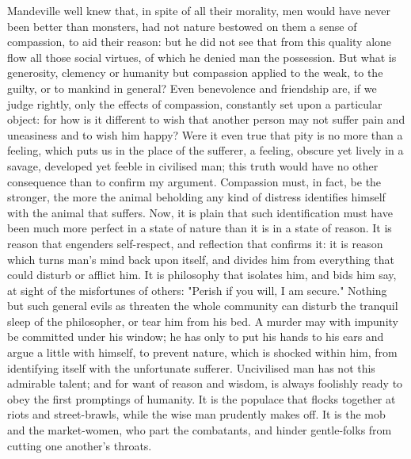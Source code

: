 \documentclass[12pt]{report}
\begin{document}
Mandeville well knew that, in spite of all their morality, men would have never been better than monsters, had not nature bestowed on them a sense of compassion, to aid their reason: but he did not see that from this quality alone flow all those social virtues, of which he denied man the possession. But what is generosity, clemency or humanity but compassion applied to the weak, to the guilty, or to mankind in general? Even benevolence and friendship are, if we judge rightly, only the effects of compassion, constantly set upon a particular object: for how is it different to wish that another person may not suffer pain and uneasiness and to wish him happy? Were it even true that pity is no more than a feeling, which puts us in the place of the sufferer, a feeling, obscure yet lively in a savage, developed yet feeble in civilised man; this truth would have no other consequence than to confirm my argument. Compassion must, in fact, be the stronger, the more the animal beholding any kind of distress identifies himself with the animal that suffers. Now, it is plain that such identification must have been much more perfect in a state of nature than it is in a state of reason. It is reason that engenders self-respect, and reflection that confirms it: it is reason which turns man's mind back upon itself, and divides him from everything that could disturb or afflict him. It is philosophy that isolates him, and bids him say, at sight of the misfortunes of others: "Perish if you will, I am secure." Nothing but such general evils as threaten the whole community can disturb the tranquil sleep of the philosopher, or tear him from his bed. A murder may with impunity be committed under his window; he has only to put his hands to his ears and argue a little with himself, to prevent nature, which is shocked within him, from identifying itself with the unfortunate sufferer. Uncivilised man has not this admirable talent; and for want of reason and wisdom, is always foolishly ready to obey the first promptings of humanity. It is the populace that flocks together at riots and street-brawls, while the wise man prudently makes off. It is the mob and the market-women, who part the combatants, and hinder gentle-folks from cutting one another's throats.
\end{document}
